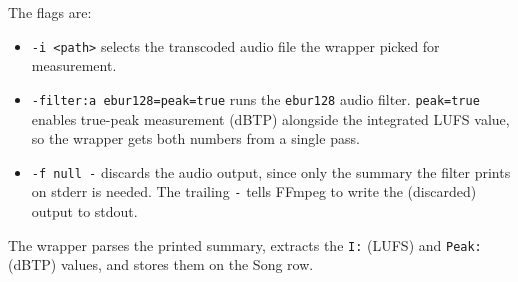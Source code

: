 \documentclass[a4paper,11pt]{article}
\begin{document}
The flags are:
\begin{itemize}
    \item \texttt{-i <path>} selects the transcoded audio file the
    wrapper picked for measurement.
    \item \texttt{-filter:a ebur128=peak=true} runs the \texttt{ebur128}
    audio filter. \texttt{peak=true} enables true-peak measurement
    (dBTP) alongside the integrated LUFS value, so the wrapper gets
    both numbers from a single pass.
    \item \texttt{-f null -} discards the audio output, since only the
    summary the filter prints on stderr is needed. The trailing
    \texttt{-} tells FFmpeg to write the (discarded) output to stdout.
\end{itemize}

The wrapper parses the printed summary, extracts the \texttt{I:} (LUFS)
and \texttt{Peak:} (dBTP) values, and stores them on the Song row.

\printbibliography
\end{document}
